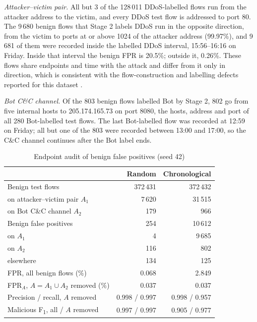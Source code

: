 \documentclass[conference]{IEEEtran}
\newcommand{\Fone}{F\textsubscript{1}}
\begin{document}
\textit{Attacker--victim pair.} All but 3 of the 128\,011 DDoS-labelled flows run from the attacker address to the victim, and every DDoS test flow is addressed to port 80. The 9\,680 benign flows that Stage 2 labels DDoS run in the opposite direction, from the victim to ports at or above 1024 of the attacker address (99.97\%), and 9\,681 of them were recorded inside the labelled DDoS interval, 15:56--16:16 on Friday. Inside that interval the benign FPR is 20.5\%; outside it, 0.26\%. These flows share endpoints and time with the attack and differ from it only in direction, which is consistent with the flow-construction and labelling defects reported for this dataset \cite{engelen2021,lanvin2023}.

\textit{Bot C\&C channel.} Of the 803 benign flows labelled Bot by Stage 2, 802 go from five internal hosts to 205.174.165.73 on port 8080, the hosts, address and port of all 280 Bot-labelled test flows. The last Bot-labelled flow was recorded at 12:59 on Friday; all but one of the 803 were recorded between 13:00 and 17:00, so the C\&C channel continues after the Bot label ends.

\begin{table}[t]
\centering
\caption{Endpoint audit of benign false positives (seed 42)}
\label{tab:audit}
\footnotesize
\setlength{\tabcolsep}{3pt}
\begin{tabular}{@{}lrr@{}}
\toprule
 & Random & Chronological \\
\midrule
Benign test flows & 372\,431 & 372\,432 \\
\quad on attacker--victim pair $A_1$ & 7\,620 & 31\,515 \\
\quad on Bot C\&C channel $A_2$ & 179 & 966 \\
Benign false positives & 254 & 10\,612 \\
\quad on $A_1$ & 4 & 9\,685 \\
\quad on $A_2$ & 116 & 802 \\
\quad elsewhere & 134 & 125 \\
\midrule
FPR, all benign flows (\%) & 0.068 & 2.849 \\
FPR$_A$, $A=A_1\cup A_2$ removed (\%) & 0.037 & 0.037 \\
Precision / recall, $A$ removed & 0.998 / 0.997 & 0.998 / 0.957 \\
Malicious \Fone{}, all / $A$ removed & 0.997 / 0.997 & 0.905 / 0.977 \\
\bottomrule
\end{tabular}
\end{table}
\end{document}
